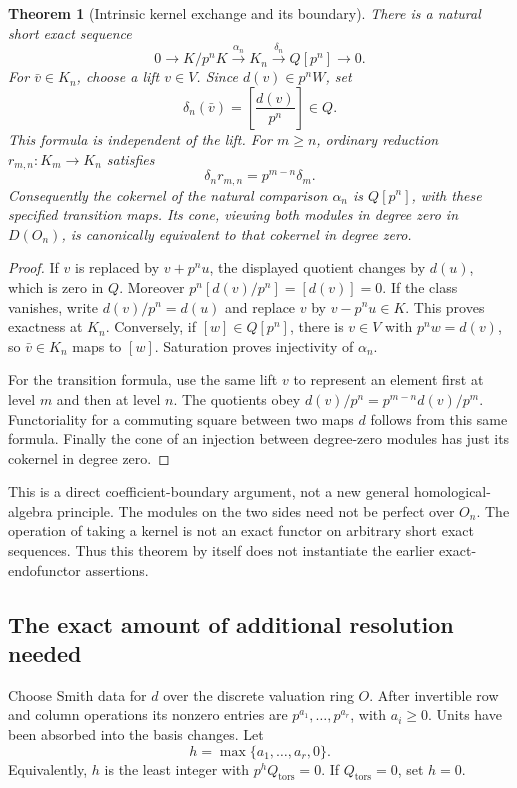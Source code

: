 \documentclass[11pt]{article}
\newtheorem{theorem}{Theorem}[section]
\theoremstyle{definition}
\theoremstyle{remark}
\begin{document}
\begin{theorem}[Intrinsic kernel exchange and its boundary]\label{thm:kernel-bockstein}
There is a natural short exact sequence
\[
 \boxed{0\longrightarrow K/p^nK\xrightarrow{\alpha_n}K_n
 \xrightarrow{\delta_n}Q[p^n]\longrightarrow0.}
\]
For $\bar v\in K_n$, choose a lift $v\in V$. Since $d(v)\in p^nW$, set
\[
 \delta_n(\bar v)=\left[\frac{d(v)}{p^n}\right]\in Q.
\]
This formula is independent of the lift. For $m\geq n$, ordinary reduction $r_{m,n}:K_m\to K_n$ satisfies
\[
 \boxed{\delta_n r_{m,n}=p^{m-n}\delta_m.}
\]
Consequently the cokernel of the natural comparison $\alpha_n$ is $Q[p^n]$, with these specified transition maps. Its cone, viewing both modules in degree zero in $D(O_n)$, is canonically equivalent to that cokernel in degree zero.
\end{theorem}
\begin{proof}
If $v$ is replaced by $v+p^n u$, the displayed quotient changes by $d(u)$, which is zero in $Q$. Moreover $p^n[d(v)/p^n]=[d(v)]=0$. If the class vanishes, write $d(v)/p^n=d(u)$ and replace $v$ by $v-p^n u\in K$. This proves exactness at $K_n$. Conversely, if $[w]\in Q[p^n]$, there is $v\in V$ with $p^n w=d(v)$, so $\bar v\in K_n$ maps to $[w]$. Saturation proves injectivity of $\alpha_n$.

For the transition formula, use the same lift $v$ to represent an element first at level $m$ and then at level $n$. The quotients obey $d(v)/p^n=p^{m-n}d(v)/p^m$. Functoriality for a commuting square between two maps $d$ follows from this same formula. Finally the cone of an injection between degree-zero modules has just its cokernel in degree zero.
\end{proof}

This is a direct coefficient-boundary argument, not a new general homological-algebra principle. The modules on the two sides need not be perfect over $O_n$. The operation of taking a kernel is not an exact functor on arbitrary short exact sequences. Thus this theorem by itself does not instantiate the earlier exact-endofunctor assertions.

\subsection{The exact amount of additional resolution needed}

Choose Smith data for $d$ over the discrete valuation ring $O$. After invertible row and column operations its nonzero entries are $p^{a_1},\ldots,p^{a_r}$, with $a_i\geq0$. Units have been absorbed into the basis changes. Let
\[
 h=\max\{a_1,\ldots,a_r,0\}.
\]
Equivalently, $h$ is the least integer with $p^h Q_{\mathrm{tors}}=0$. If $Q_{\mathrm{tors}}=0$, set $h=0$.
\end{document}
